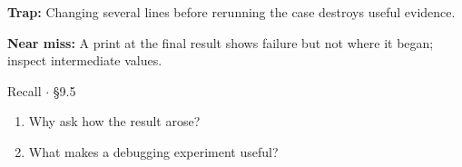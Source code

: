 \documentclass[11pt]{article}
\begin{document}
\begin{keepsection}
\begin{notebox}\textbf{Trap:} Changing several lines before rerunning the case destroys useful evidence.\end{notebox}

\begin{notebox}\textbf{Near miss:} A print at the final result shows failure but not where it began; inspect intermediate values.\end{notebox}

\begin{recallbox}{Recall \ensuremath{\cdot} §9.5}
\begin{enumerate}
\item Why ask how the result arose?
\item What makes a debugging experiment useful?
\end{enumerate}

\end{recallbox}
\end{keepsection}
\end{document}
